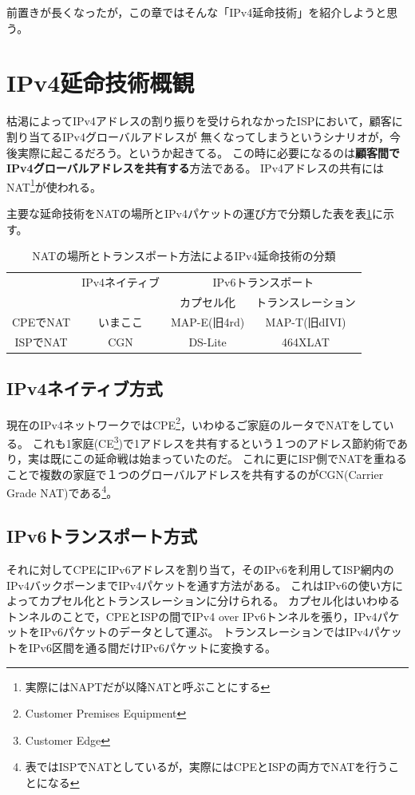 前置きが長くなったが，この章ではそんな「IPv4延命技術」を紹介しようと思う。

\section{IPv4延命技術概観}

枯渇によってIPv4アドレスの割り振りを受けられなかったISPにおいて，顧客に割り当てるIPv4グローバルアドレスが
無くなってしまうというシナリオが，今後実際に起こるだろう。というか起きてる。
この時に必要になるのは\textbf{顧客間でIPv4グローバルアドレスを共有する}方法である。
IPv4アドレスの共有にはNAT\footnote{実際にはNAPTだが以降NATと呼ぶことにする}が使われる。

主要な延命技術をNATの場所とIPv4パケットの運び方で分類した表を表\ref{yuyarin-nat-transport}に示す。

\begin{table}[htbp]
\begin{center}
\begin{tabular}{c|ccc} \hline
 & IPv4ネイティブ & \multicolumn{2}{c}{IPv6トランスポート} \\
 & & カプセル化 & トランスレーション \\\hline
CPEでNAT & いまここ & MAP-E(旧4rd) & MAP-T(旧dIVI) \\
ISPでNAT & CGN & DS-Lite & 464XLAT \\\hline
\end{tabular}
\end{center}
\caption{NATの場所とトランスポート方法によるIPv4延命技術の分類}
\label{yuyarin-nat-transport}
\end{table}

\subsection{IPv4ネイティブ方式}

現在のIPv4ネットワークではCPE\footnote{Customer Premises Equipment}，いわゆるご家庭のルータでNATをしている。
これも1家庭(CE\footnote{Customer Edge})で1アドレスを共有するという１つのアドレス節約術であり，実は既にこの延命戦は始まっていたのだ。
これに更にISP側でNATを重ねることで複数の家庭で１つのグローバルアドレスを共有するのがCGN(Carrier Grade NAT)である\footnote{表ではISPでNATとしているが，実際にはCPEとISPの両方でNATを行うことになる}。

\subsection{IPv6トランスポート方式}
それに対してCPEにIPv6アドレスを割り当て，そのIPv6を利用してISP網内のIPv4バックボーンまでIPv4パケットを通す方法がある。
これはIPv6の使い方によってカプセル化とトランスレーションに分けられる。
カプセル化はいわゆるトンネルのことで，CPEとISPの間でIPv4 over IPv6トンネルを張り，IPv4パケットをIPv6パケットのデータとして運ぶ。
トランスレーションではIPv4パケットをIPv6区間を通る間だけIPv6パケットに変換する。

